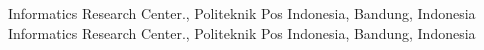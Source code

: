  Informatics Research Center., Politeknik Pos Indonesia, Bandung,
Indonesia
 Informatics Research Center., Politeknik Pos Indonesia, Bandung,
Indonesia
